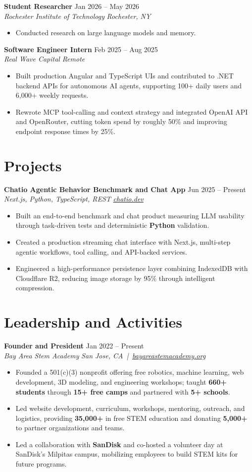 \documentclass[10pt,letterpaper]{article}
\newif\ifresumeFirstRole
\newcommand{\resumeRole}[4]{%
  \ifresumeFirstRole
    \global\resumeFirstRolefalse
  \else
    \vspace{0pt plus 1fill}%
  \fi
  \textbf{#1} \hfill #2\\
  \textit{#3} \hfill \textit{#4}
}
\begin{document}
\resumeRole{Student Researcher}{Jan 2026 -- May 2026}{Rochester Institute of Technology}{Rochester, NY}
\begin{itemize}
  \item Conducted research on large language models and memory.
\end{itemize}

\resumeRole{Software Engineer Intern}{Feb 2025 -- Aug 2025}{Real Wave Capital}{Remote}
\begin{itemize}
  \item Built production Angular and TypeScript UIs and contributed to .NET backend APIs for autonomous AI agents, supporting 100+ daily users and 6,000+ weekly requests.
  \item Rewrote MCP tool-calling and context strategy and integrated OpenAI API and OpenRouter, cutting token spend by roughly 50\% and improving endpoint response times by 25\%.
\end{itemize}

\section*{Projects}
\resumeRole{Chatio Agentic Behavior Benchmark and Chat App}{Jun 2025 -- Present}{Next.js, Python, TypeScript, REST}{\href{https://chatio.dev}{chatio.dev}}
\begin{itemize}
  \item Built an end-to-end benchmark and chat product measuring LLM usability through task-driven tests and deterministic \textbf{Python} validation.
  \item Created a production streaming chat interface with Next.js, multi-step agentic workflows, tool calling, and API-backed services.
  \item Engineered a high-performance persistence layer combining IndexedDB with Cloudflare R2, reducing image storage by 95\% through intelligent compression.
\end{itemize}

\section*{Leadership and Activities}
\resumeRole{Founder and President}{Jan 2022 -- Present}{Bay Area Stem Academy}{San Jose, CA \,|\, \href{https://bayareastemacademy.org}{bayareastemacademy.org}}
\begin{itemize}
  \item Founded a 501(c)(3) nonprofit offering free robotics, machine learning, web development, 3D modeling, and engineering workshops; taught \textbf{660+ students} through \textbf{15+ free camps} and partnered with \textbf{5+ schools}.
  \item Led website development, curriculum, workshops, mentoring, outreach, and logistics, providing \textbf{\textdollar{}35,000+} in free STEM education and donating \textbf{\textdollar{}5,000+} to partner organizations and teams.
  \item Led a collaboration with \textbf{SanDisk} and co-hosted a volunteer day at SanDisk's Milpitas campus, mobilizing employees to build STEM kits for future programs.
\end{itemize}
\end{document}
